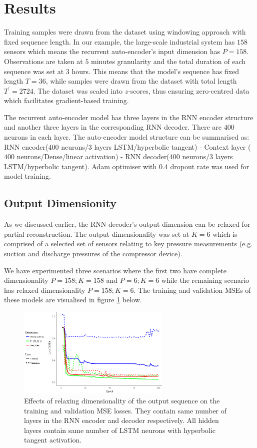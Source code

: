 \documentclass[runningheads]{llncs}
\begin{document}
\section{Results}

Training samples were drawn from the dataset using windowing approach with fixed sequence length. In our example, the large-scale industrial system has \(158\) sensors which means the recurrent auto-encoder's input dimension has \(P=158\). Observations are taken at \(5\) minutes granularity and the total duration of each sequence was set at \(3\) hours. This means that the model's sequence has fixed length \(T=36\), while samples were drawn from the dataset with total length \(T^\prime=2724\). The dataset was scaled into \(z\)-scores, thus ensuring zero-centred data which facilitates gradient-based training.

The recurrent auto-encoder model has three layers in the RNN encoder structure and another three layers in the corresponding RNN decoder. There are \(400\) neurons in each layer. The auto-encoder model structure can be summarised as: RNN encoder(\(400\) neurons/\(3\) layers LSTM/hyperbolic tangent) - Context layer (\(400\) neurons/Dense/linear activation) - RNN decoder(\(400\) neurons/\(3\) layers LSTM/hyperbolic tangent). Adam optimiser \cite{kingma} with \(0.4\) dropout rate was used for model training.

\subsection{Output Dimensionity}

As we discussed earlier, the RNN decoder's output dimension can be relaxed for partial reconstruction. The output dimensionality was set at \(K=6\) which is comprised of a selected set of sensors relating to key pressure measurements (e.g. suction and discharge pressures of the compressor device).

We have experimented three scenarios where the first two have complete dimensionality \(P=158; K=158\) and \(P=6; K=6\) while the remaining scenario has relaxed dimensionality \(P=158; K=6\). The training and validation MSEs of these models are visualised in figure \ref{fig:output_dims} below.

\begin{figure}[h]
	\centering
	\includegraphics[width=0.65\textwidth]{output_dims.PNG}
	\caption{Effects of relaxing dimensionality of the output sequence on the training and validation MSE losses. They contain same number of layers in the RNN encoder and decoder respectively. All hidden layers contain same number of LSTM neurons with hyperbolic tangent activation.}
	\label{fig:output_dims}
\end{figure}
\end{document}
